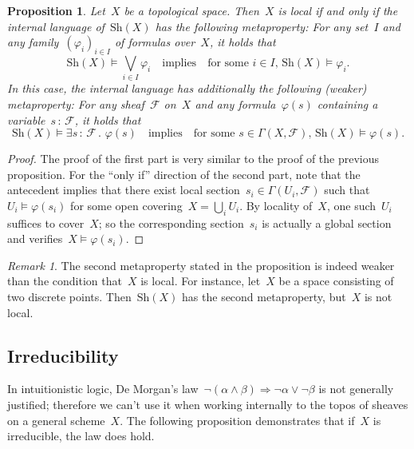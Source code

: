 \documentclass[10pt]{amsart}
\theoremstyle{definition}
\theoremstyle{plain}
\newtheorem{prop}[defn]{Proposition}
\theoremstyle{remark}
\newtheorem{rem}[defn]{Remark}
\newcommand{\F}{\mathcal{F}}
\newcommand{\Sh}{\mathrm{Sh}}
\newcommand{\?}{\,{:}\,}
\renewcommand{\_}{\mathpunct{.}\,}
\begin{document}
\begin{prop}Let~$X$ be a topological space. Then~$X$ is local if and
only if the internal language of~$\Sh(X)$ has the following metaproperty:
For any set~$I$ and any family~$(\varphi_i)_{i \in I}$ of
formulas over~$X$, it holds that
\[ \Sh(X) \models \bigvee_{i \in I} \varphi_i
  \quad\text{implies}\quad
  \text{for some~$i \in I$, $\Sh(X) \models \varphi_i$}. \]
In this case, the internal language has additionally the following (weaker) metaproperty: For any
sheaf~$\F$ on~$X$ and any formula~$\varphi(s)$ containing a variable~$s\?\F$,
it holds that
\[ \Sh(X) \models \exists s\?\F\_ \varphi(s)
  \quad\text{implies}\quad
  \text{for some~$s \in \Gamma(X,\F)$, $\Sh(X) \models \varphi(s)$}. \]
\end{prop}
\begin{proof}The proof of the first part is very similar to the proof of the
previous proposition. For the ``only if'' direction of the second part, note
that the antecedent implies that there exist local section~$s_i \in
\Gamma(U_i,\F)$ such that~$U_i \models \varphi(s_i)$ for some open covering~$X
= \bigcup_i U_i$. By locality of~$X$, one such~$U_i$ suffices to cover~$X$; so
the corresponding section~$s_i$ is actually a global section and verifies~$X
\models \varphi(s_i)$.
\end{proof}

\begin{rem}The second metaproperty stated in the proposition is indeed weaker
than the condition that~$X$ is local. For instance, let~$X$ be a space consisting
of two discrete points. Then~$\Sh(X)$ has the second metaproperty, but~$X$ is
not local.\end{rem}


\subsection{Irreducibility}

In intuitionistic logic, De Morgan's law~$\neg(\alpha \wedge \beta)
\Rightarrow \neg\alpha \vee \neg\beta$ is not generally justified; therefore we
can't use it when working internally to the topos of sheaves on a general scheme~$X$.
The following proposition demonstrates that if~$X$ is irreducible, the law
does hold.
\end{document}
